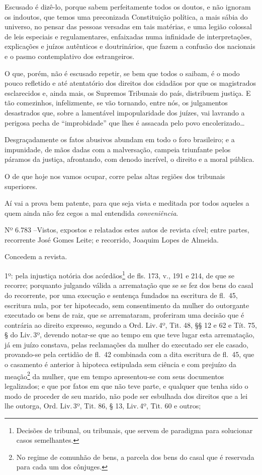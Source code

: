 Escusado é dizê-lo, porque sabem perfeitamente todos os doutos, e não
ignoram os indoutos, que temos uma preconizada Constituição política, a
mais sábia do universo, no pensar das pessoas versadas em tais matérias,
e uma legião colossal de leis especiais e regulamentares, enfaixadas
numa infinidade de interpretações, explicações e juízos autênticos e
doutrinários, que fazem a confusão dos nacionais e o pasmo contemplativo
dos estrangeiros.

O que, porém, não é escusado repetir, se bem que todos o saibam, é o
modo pouco refletido e até atentatório dos direitos dos cidadãos por que
os magistrados esclarecidos e, ainda mais, os Supremos Tribunais do
país, distribuem justiça. E tão comezinhos, infelizmente, se vão
tornando, entre nós, os julgamentos desastrados que, sobre a lamentável
impopularidade dos juízes, vai lavrando a perigosa pecha de
``improbidade'' que lhes é assacada pelo povo encolerizado\ldots{}

Desgraçadamente os fatos abusivos abundam em todo o foro brasileiro; e a
impunidade, de mãos dadas com a malversação, campeia triunfante pelos
páramos da justiça, afrontando, com denodo incrível, o direito e a moral
pública.

O de que hoje nos vamos ocupar, corre pelas altas regiões dos tribunais
superiores.

Aí vai a prova bem patente, para que seja vista e meditada por todos
aqueles a quem ainda não fez cegos a mal entendida \emph{conveniência}.

Nº 6.783 --Vistos, expostos e relatados estes autos de revista cível;
entre partes, recorrente José Gomes Leite; e recorrido, Joaquim Lopes de
Almeida.

Concedem a revista.

1º: pela injustiça notória dos acórdãos\footnote{Decisões de tribunal,
  ou tribunais, que servem de paradigma para solucionar casos
  semelhantes.} de fls. 173, v., 191 e 214, de que se recorre;
porquanto julgando válida a arrematação que se se fez dos bens do casal
do recorrente, por uma execução e sentença fundados na escritura
de fl.~45, escritura nula, por ter hipotecado, sem consentimento
da mulher do outorgante executado os bens de raiz, que se arremataram,
proferiram uma decisão que é contrária ao direito expresso, segundo a
Ord. Liv.\,4º, Tit. 48, §§ 12 e 62 e Tít. 75, § do Liv.\,3º, devendo
notar-se que ao tempo em que teve lugar esta arrematação, já em juízo
constava, pelas reclamações da mulher do executado ser ele casado,
provando-se pela certidão de fl.~42 combinada com a dita escritura
de fl.~45, que o casamento é anterior à hipoteca estipulada sem
ciência e com prejuízo da meação\footnote{No regime de comunhão de
  bens, a parcela dos bens do casal que é reservada para cada um dos
  cônjuges.} da mulher, que em tempo apresentou-se com seus documentos
legalizados; e que por fatos em que não teve parte, e qualquer que tenha
sido o modo de proceder de seu marido, não pode ser esbulhada dos
direitos que a lei lhe outorga, Ord. Liv.\,3º, Tit. 86, § 13, Liv.\,4º,
Tit. 60 e outros;

